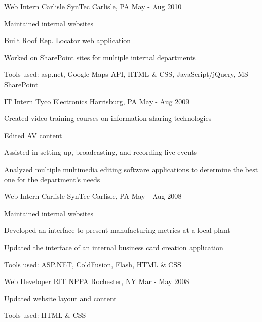 \begin{cventries}
  \cventry
    {Web Intern}
    {Carlisle SynTec}
    {Carlisle, PA}
    {May - Aug 2010}
    {
      \begin{cvitems}
        \item {Maintained internal websites}
        \item {Built Roof Rep. Locator web application}
        \item {Worked on SharePoint sites for multiple internal departments}
        \item {Tools used: asp.net, Google Maps API, HTML \& CSS, JavaScript/jQuery, MS SharePoint}
      \end{cvitems}
    }

  \cventry
    {IT Intern}
    {Tyco Electronics}
    {Harrisburg, PA}
    {May - Aug 2009}
    {
      \begin{cvitems}
        \item {Created video training courses on information sharing technologies}
        \item {Edited AV content}
        \item {Assisted in setting up, broadcasting, and recording live events}
        \item {Analyzed multiple multimedia editing software applications to determine the best one for the department's needs}
      \end{cvitems}
    }

  \cventry
    {Web Intern}
    {Carlisle SynTec}
    {Carlisle, PA}
    {May - Aug 2008}
    {
      \begin{cvitems}
        \item {Maintained internal websites}
        \item {Developed an interface to present manufacturing metrics at a local plant}
        \item {Updated the interface of an internal business card creation application}
        \item {Tools used: ASP.NET, ColdFusion, Flash, HTML \& CSS}
      \end{cvitems}
    }

  \cventry
    {Web Developer}
    {RIT NPPA}
    {Rochester, NY}
    {Mar - May 2008}
    {
      \begin{cvitems}
        \item {Updated website layout and content}
        \item {Tools used: HTML \& CSS}
      \end{cvitems}
    }


\end{cventries}
